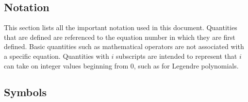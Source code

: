 \documentclass[10pt]{article}
\begin{document}
\begin{flushleft}
\section{Notation}

This section lists all the important notation used in this document. Quantities that are defined are referenced to the equation number in which they are first defined. Basic quantities such as mathematical operators are not associated with a specific equation. Quantities with \(i\) subscripts are intended to represent that \(i\) can take on integer values beginning from \(0\), such as for Legendre polynomials.

\subsection{Symbols}


\end{flushleft}
\end{document}
